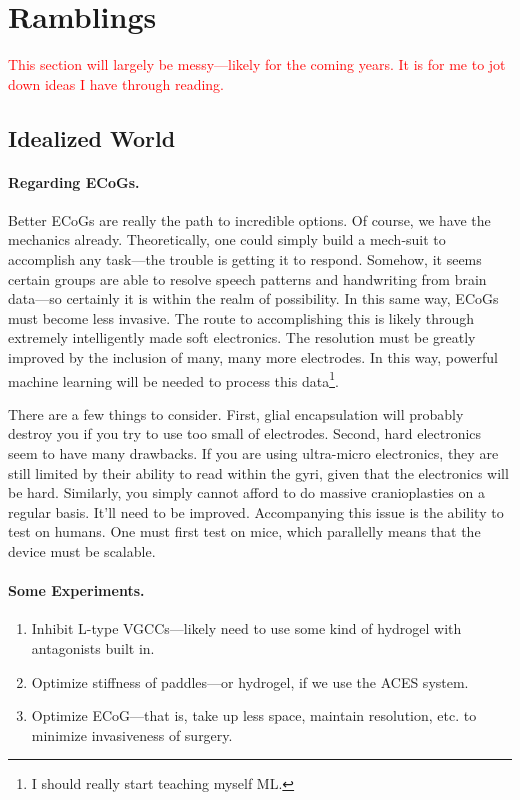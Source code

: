 \documentclass[12pt]{report}
\begin{document}
\chapter{Ramblings}

{\large \textcolor{red}{This section will largely be messy---likely for the coming years. It is for me to jot down ideas I have through reading.}}\newline

\section{Idealized World}

\subsubsection{Regarding ECoGs.}
Better ECoGs are really the path to incredible options. Of course, we have the mechanics already. Theoretically, one could simply build a mech-suit to accomplish any task---the trouble is getting it to respond. Somehow, it seems certain groups are able to resolve speech patterns and handwriting from brain data---so certainly it is within the realm of possibility. In this same way, ECoGs must become less invasive. The route to accomplishing this is likely through extremely intelligently made soft electronics. The resolution must be greatly improved by the inclusion of many, many more electrodes. In this way, powerful machine learning will be needed to process this data\footnote{I should really start teaching myself ML.}.\newline

There are a few things to consider. First, glial encapsulation will probably destroy you if you try to use too small of electrodes. Second, hard electronics seem to have many drawbacks. If you are using ultra-micro electronics, they are still limited by their ability to read within the gyri, given that the electronics will be hard. Similarly, you simply cannot afford to do massive cranioplasties on a regular basis. It'll need to be improved. Accompanying this issue is the ability to test on humans. One must first test on mice, which parallelly means that the device must be scalable. 


\subsubsection{Some Experiments.}


\begin{enumerate}
    \item Inhibit L-type VGCCs---likely need to use some kind of hydrogel with antagonists built in. 
    \item Optimize stiffness of paddles---or hydrogel, if we use the ACES system. 
    \item Optimize ECoG---that is, take up less space, maintain resolution, etc. to minimize invasiveness of surgery. 
\end{enumerate}
\end{document}

